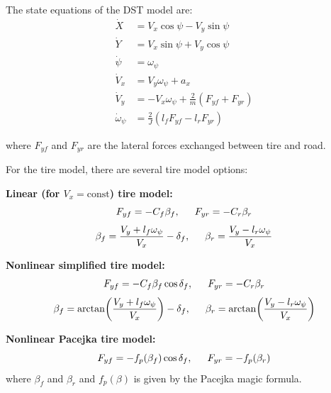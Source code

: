 The state equations of the \acs{DST} model are:
\begin{align}
    \dot{X}           &= V_x \cos\psi - V_y \sin\psi \\
    \dot{Y}           &= V_x \sin\psi + V_y \cos\psi \\
    \dot{\psi}        &= \omega_\psi \\
    \dot{V}_x         &= V_y \omega_\psi + a_x \\
    \dot{V}_y         &= -V_x \omega_\psi + \frac{2}{m}\left(F_{yf} + F_{yr}\right) \\
    \dot{\omega}_\psi &= \frac{2}{J}\left(l_f F_{yf} - l_r F_{yr}\right)
\end{align}

where $F_{yf}$ and $F_{yr}$ are the lateral forces exchanged between tire and road.

For the tire model, there are several tire model options:

\medskip
\noindent\textbf{Linear (for $V_x = \mathrm{const}$) tire model:}
\begin{equation}
    F_{yf} = -C_f \beta_f, \hspace{1.5em} F_{yr} = -C_r \beta_r
\end{equation}
\begin{equation}
    \beta_f = \frac{V_y + l_f \omega_\psi}{V_x} - \delta_f, \hspace{1.5em} \beta_r = \frac{V_y - l_r \omega_\psi}{V_x}
\end{equation}

\noindent\textbf{Nonlinear simplified tire model:}
\begin{equation}
    F_{yf} = -C_f \beta_f \cos\delta_f, \hspace{1.5em} F_{yr} = -C_r \beta_r
\end{equation}
\begin{equation}
    \beta_f = \arctan\!\left(\frac{V_y + l_f \omega_\psi}{V_x}\right) - \delta_f, \hspace{1.5em} \beta_r = \arctan\!\left(\frac{V_y - l_r \omega_\psi}{V_x}\right)
\end{equation}

\noindent\textbf{Nonlinear Pacejka tire model:}
\begin{equation}
    F_{yf} = -f_p(\beta_f)\cos\delta_f, \hspace{1.5em} F_{yr} = -f_p(\beta_r)
\end{equation}
where $\beta_f$ and $\beta_r$ and $f_p(\beta)$ is given by the Pacejka magic formula.

